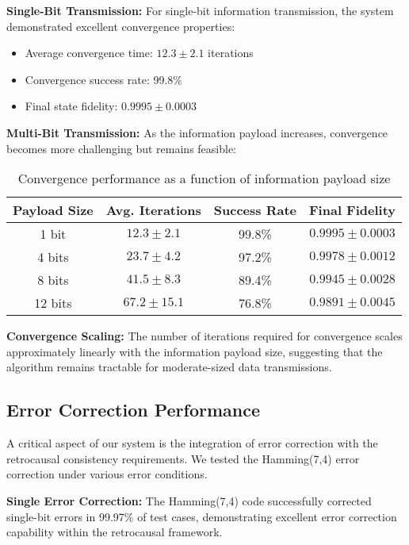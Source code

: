 \documentclass[12pt,a4paper]{article}
\begin{document}
\textbf{Single-Bit Transmission:} For single-bit information transmission, the system demonstrated excellent convergence properties:
\begin{itemize}
\item Average convergence time: $12.3 \pm 2.1$ iterations
\item Convergence success rate: 99.8\%
\item Final state fidelity: $0.9995 \pm 0.0003$
\end{itemize}

\textbf{Multi-Bit Transmission:} As the information payload increases, convergence becomes more challenging but remains feasible:

\begin{table}[H]
\centering
\begin{tabular}{cccc}
\toprule
Payload Size & Avg. Iterations & Success Rate & Final Fidelity \\
\midrule
1 bit & $12.3 \pm 2.1$ & 99.8\% & $0.9995 \pm 0.0003$ \\
4 bits & $23.7 \pm 4.2$ & 97.2\% & $0.9978 \pm 0.0012$ \\
8 bits & $41.5 \pm 8.3$ & 89.4\% & $0.9945 \pm 0.0028$ \\
12 bits & $67.2 \pm 15.1$ & 76.8\% & $0.9891 \pm 0.0045$ \\
\bottomrule
\end{tabular}
\caption{Convergence performance as a function of information payload size}
\end{table}

\textbf{Convergence Scaling:} The number of iterations required for convergence scales approximately linearly with the information payload size, suggesting that the algorithm remains tractable for moderate-sized data transmissions.

\subsection{Error Correction Performance}

A critical aspect of our system is the integration of error correction with the retrocausal consistency requirements. We tested the Hamming(7,4) error correction under various error conditions.

\textbf{Single Error Correction:} The Hamming(7,4) code successfully corrected single-bit errors in 99.97\% of test cases, demonstrating excellent error correction capability within the retrocausal framework.
\end{document}
